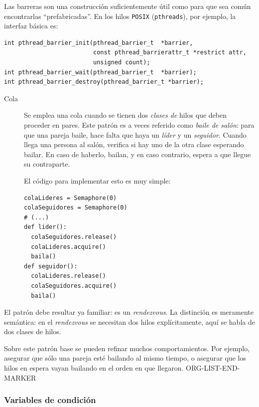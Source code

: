 \documentclass[11pt,fleqn]{book} %
\begin{document}
	     Las barreras son una construcción suficientemente útil
             como para que sea común encontrarlas ``prefabricadas''. En
             los hilos \texttt{POSIX} (\texttt{pthreads}), por ejemplo, la interfaz
             básica es:


\begin{verbatim}
int pthread_barrier_init(pthread_barrier_t  *barrier,
                         const pthread_barrierattr_t *restrict attr,
                         unsigned count);
int pthread_barrier_wait(pthread_barrier_t  *barrier);
int pthread_barrier_destroy(pthread_barrier_t *barrier);
\end{verbatim}

\begin{description}
\item[Cola] Se emplea una cola cuando se tienen dos \emph{clases de}
          hilos que deben proceder en pares. Este patrón es a veces
          referido como \emph{baile de salón}: para que una pareja baile,
          hace falta que haya un \emph{líder} y un \emph{seguidor}. Cuando
          llega una persona al salón, verifica si hay uno de la otra
          clase esperando bailar. En caso de haberlo, bailan, y en
          caso contrario, espera a que llegue su contraparte.

	  El código para implementar esto es muy simple:


\begin{verbatim}
colaLideres = Semaphore(0)
colaSeguidores = Semaphore(0)
# (...)
def lider():
  colaSeguidores.release()
  colaLideres.acquire()
  baila()
def seguidor():
  colaLideres.release()
  colaSeguidores.acquire()
  baila()
\end{verbatim}
\end{description}

	  El patrón debe resultar ya familiar: es un \emph{rendezvous}. La
          distinción es meramente semántica: en el \emph{rendezvous}
          se necesitan dos hilos explícitamente, aquí se habla de
          dos clases de hilos.

	  Sobre este patrón base se pueden refinar muchos
          comportamientos. Por ejemplo, asegurar que sólo una pareja
          esté bailando al mismo tiempo, o asegurar que los hilos en
          espera vayan bailando en el orden en que llegaron.
ORG-LIST-END-MARKER
\subsubsection{Variables de condición}
\label{sec-3-3-3-3}
\end{document}
